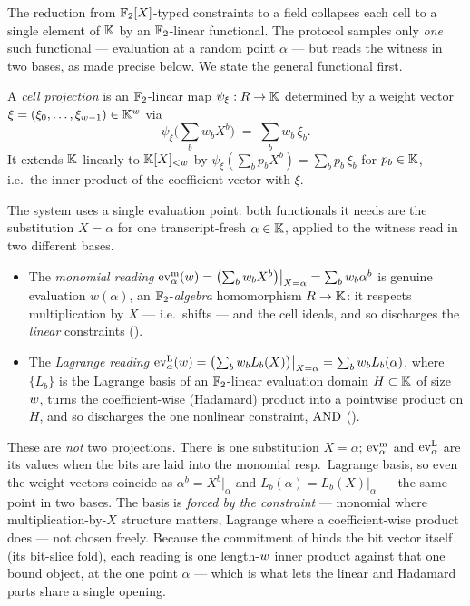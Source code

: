 The reduction from $\mathbb{F}_2[X]$-typed constraints to a field collapses each
cell to a single element of $\mathbb{K}$ by an $\mathbb{F}_2$-linear functional. The
protocol samples only \emph{one} such functional --- evaluation at a random
point $\alpha$ --- but reads the witness in two bases, as made precise
below. We state the general functional first.

\begin{definition}
\label{def:projection}
A \emph{cell projection} is an $\mathbb{F}_2$-linear map
$\psi_\xi:R\to\mathbb{K}$ determined by a weight vector
$\xi = (\xi_0,\dots,\xi_{w-1})\in\mathbb{K}^{w}$ via
\[
  \psi_\xi\Big(\textstyle\sum_b w_b X^b\Big) \;=\; \sum_b w_b\,\xi_b.
\]
It extends $\mathbb{K}$-linearly to $\mathbb{K}[X]_{<w}$ by $\psi_\xi(\sum_b p_b X^b) =
\sum_b p_b\,\xi_b$ for $p_b\in\mathbb{K}$, i.e.\ the inner product of the
coefficient vector with $\xi$.
\end{definition}

The system uses a single evaluation point: both functionals it needs are
the substitution $X=\alpha$ for one transcript-fresh $\alpha\in\mathbb{K}$, applied
to the witness read in two different bases.
\begin{itemize}[leftmargin=2em]
  \item The \emph{monomial reading}
    $\operatorname{ev}^{\mathrm{m}}_{\alpha}(w) = \bigl(\textstyle\sum_b w_b X^b\bigr)\big|_{X=\alpha} = \sum_b w_b\alpha^b$
    is genuine evaluation $w(\alpha)$, an $\mathbb{F}_2$-\emph{algebra} homomorphism
    $R\to\mathbb{K}$: it respects multiplication by $X$ --- i.e.\ shifts ---
    and the cell ideals, and so discharges the \emph{linear} constraints
    ().
  \item The \emph{Lagrange reading}
    $\operatorname{ev}^{\mathrm{L}}_{\alpha}(w) = \bigl(\textstyle\sum_b w_b L_b(X)\bigr)\big|_{X=\alpha} = \sum_b w_b L_b(\alpha)$,
    where $\{L_b\}$ is the Lagrange basis of an $\mathbb{F}_2$-linear evaluation
    domain $H\subset\mathbb{K}$ of size $w$, turns the coefficient-wise
    (Hadamard) product into a pointwise product on $H$, and so discharges
    the one nonlinear constraint, $\operatorname{AND}$ ().
\end{itemize}
These are \emph{not} two projections. There is one substitution $X=\alpha$;
$\operatorname{ev}^{\mathrm{m}}_{\alpha}$ and $\operatorname{ev}^{\mathrm{L}}_{\alpha}$ are its values when the bits are laid into the monomial
resp.\ Lagrange basis, so even the weight vectors coincide as
$\alpha^b = X^b|_{\alpha}$ and $L_b(\alpha) = L_b(X)|_{\alpha}$ --- the same
point in two bases. The basis is \emph{forced by the constraint} --- monomial
where multiplication-by-$X$ structure matters, Lagrange where a
coefficient-wise product does --- not chosen freely. Because the commitment
of  binds the bit vector itself (its bit-slice fold),
each reading is one length-$w$ inner product against that one bound
object, at the one point $\alpha$ --- which is what lets the linear and
Hadamard parts share a single opening.

